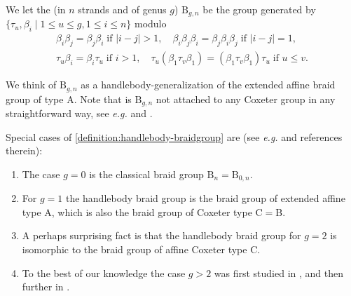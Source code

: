 \documentclass[a4paper,11pt]{amsart}
\let\emph\relax
\newcommand{\eg}{\textsl{e.g.}}
\newcommand{\setstuff}[1]{\mathrm{#1}}
\numberwithin{equation}{section}
\let\fullref\autoref
\begin{document}
\begin{definition}\label{definition:handlebody-braidgroup}
We let the \emph{handlebody braid group} (in $n$ strands and of genus $g$)
$\setstuff{B}_{g,n}$ be the group generated by 
$\{\tau_{u},\beta_{i}\mid 1\leq u\leq g,1\leq i\leq n\}$ modulo
\begin{gather}
\label{eq:handlebody-summary1}
\beta_{i}\beta_{j}=\beta_{j}\beta_{i}\;\text{if }|i-j|>1,\quad
\beta_{i}\beta_{j}\beta_{i}=\beta_{j}\beta_{i}\beta_{j}\;\text{if }|i-j|=1,
\\ 
\label{eq:handlebody-summary2}
\tau_{u}\beta_{i}
=\beta_{i}\tau_{u}\;\text{if }i>1,
\quad
\tau_{u}(\beta_{1}\tau_{v}\beta_{1})
=(\beta_{1}\tau_{v}\beta_{1})\tau_{u}
\;\text{if }u\leq v.
\end{gather}
\end{definition}

We think of $\setstuff{B}_{g,n}$ as a 
handlebody-generalization of the extended affine braid group of type A.
Note that is $\setstuff{B}_{g,n}$ not attached to any Coxeter group in any 
straightforward way, see {\eg} \cite[Remark 4]{La-handlebodies} 
and \cite[(1-7)]{RoTu-homflypt-typea}. 

\begin{remark}\label{remark:braidcox}
Special cases of \fullref{definition:handlebody-braidgroup} are (see {\eg} 
\cite[Section 1B]{RoTu-homflypt-typea} and references therein):	
\begin{enumerate}

\setlength\itemsep{0.15cm}

\item The case $g=0$ is the classical braid group $\setstuff{B}_{n}=\setstuff{B}_{0,n}$.

\item For $g=1$ the handlebody braid group is the 
braid group of extended affine type A, which 
is also the braid group of Coxeter type C$=$B.

\item A perhaps surprising fact is that the handlebody braid group 
for $g=2$ is 
isomorphic to the braid group of affine Coxeter type C.

\item To the best of our knowledge the case $g>2$ was first 
studied in \cite{Ve-handlebodies}, 
and then further in \cite{HaOlLa-handlebodies}.

\end{enumerate}
\end{remark}
\end{document}

